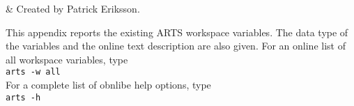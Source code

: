  \label{app:wsv}


 & Created by Patrick Eriksson. \\
\stophistory

 This appendix reports the existing ARTS workspace variables. The
 data type of the variables and the online text description are also
 given. For an online list of all workspace variables, type\\

 \verb|arts -w all| \\

 \noindent
 For a complete list of obnlibe help options, type\\ 

 \verb|arts -h| \\
 
 {\footnotesize
  }



